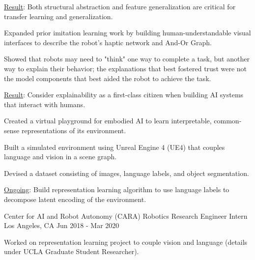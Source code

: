 \begin{cventries}
{\begin{cvitems}
  \item \underline{Result}: Both structural abstraction and feature generalization are critical for transfer learning and generalization.
\end{cvitems}
%
\begin{justify}
\end{justify}
\vspace{-1mm}
\begin{cvitems}
  \item Expanded prior imitation learning work by building human-understandable visual interfaces to describe the robot's haptic network and And-Or Graph.
  \item Showed that robots may need to "think" one way to complete a task, but another way to explain their behavior; the explanations that best fostered trust were not the model components that best aided the robot to achieve the task.
  \item \underline{Result}: Consider explainability as a first-class citizen when building AI systems that interact with humans.
\end{cvitems}
%
\newpage
\begin{justify}
\end{justify}
\vspace{-1mm}
\begin{cvitems}
  \item Created a virtual playground for embodied AI to learn interpretable, common-sense representations of its environment.
  \item Built a simulated environment using Unreal Engine 4 (UE4) that couples language and vision in a scene graph.
  \item Devised a dataset consisting of images, language labels, and object segmentation.
  \item \underline{Ongoing}: Build representation learning algorithm to use language labels to decompose latent encoding of the environment.
\end{cvitems}
}

\cventry
{Center for AI and Robot Autonomy (CARA)}
{Robotics Research Engineer Intern}
{Los Angeles, CA}
{Jun 2018 - Mar 2020}
{
\begin{cvitems}
\item Worked on representation learning project to couple vision and language (details under UCLA Graduate Student Researcher).
\end{cvitems}
}


\end{cventries}
